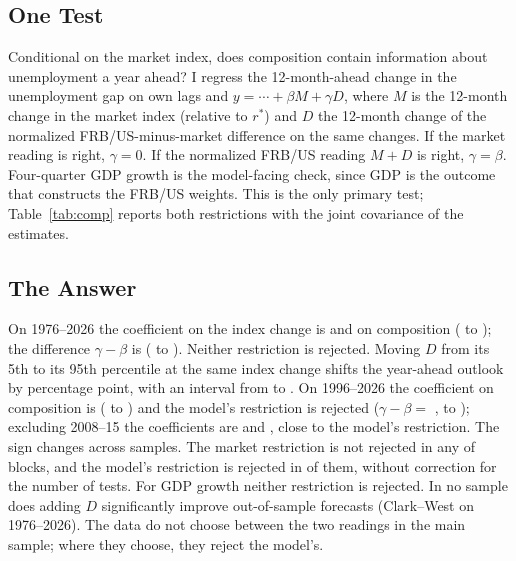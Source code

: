 \documentclass[11pt]{article}
\begin{document}
\subsection{One Test}\label{sec:onetest}
Conditional on the market index, does composition contain information about unemployment a year ahead? I regress the 12-month-ahead change in the unemployment gap on own lags and $y=\cdots+\beta M+\gamma D$, where $M$ is the 12-month change in the market index (relative to $r^*$) and $D$ the 12-month change of the normalized FRB/US-minus-market difference on the same changes. If the market reading is right, $\gamma=0$. If the normalized FRB/US reading $M+D$ is right, $\gamma=\beta$. Four-quarter GDP growth is the model-facing check, since GDP is the outcome that constructs the FRB/US weights. This is the only primary test; Table~\ref{tab:comp} reports both restrictions with the joint covariance of the estimates.

\subsection{The Answer}\label{sec:answer}
On 1976--2026 the coefficient on the index change is  and on composition  ( to ); the difference $\gamma-\beta$ is  ( to ). Neither restriction is rejected. Moving $D$ from its 5th to its 95th percentile at the same index change shifts the year-ahead outlook by  percentage point, with an interval from  to . On 1996--2026 the coefficient on composition is  ( to ) and the model's restriction is rejected ($\gamma-\beta=$ ,  to ); excluding 2008--15 the coefficients are  and , close to the model's restriction. The sign changes across samples. The market restriction is not rejected in any of  blocks, and the model's restriction is rejected in  of them, without correction for the number of tests. For GDP growth neither restriction is rejected. In no sample does adding $D$ significantly improve out-of-sample forecasts (Clark--West  on 1976--2026). The data do not choose between the two readings in the main sample; where they choose, they reject the model's.
\end{document}
